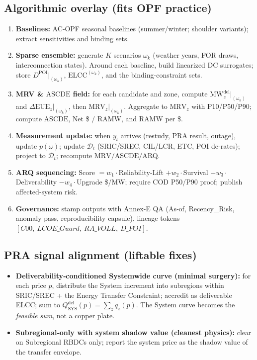 \documentclass[11pt]{article}
\newcommand{\ELCC}{\ensuremath{\mathrm{ELCC}}}
\newcommand{\EUE}{\ensuremath{\mathrm{EUE}}}
\newcommand{\ASCDE}{\ensuremath{\mathrm{ASCDE}}}
\newcommand{\MRV}{\ensuremath{\mathrm{MRV}}}
\numberwithin{equation}{section}
\theoremstyle{definition}
\theoremstyle{remark}
\begin{document}
\subsection{Algorithmic overlay (fits OPF practice)}
\begin{enumerate}[leftmargin=1.2em]
  \item \textbf{Baselines:} AC‑OPF seasonal baselines (summer/winter; shoulder variants); extract sensitivities and binding sets.
\item \textbf{Sparse ensemble:} generate $K$ scenarios $\omega_k$ (weather years, FOR draws, interconnection states).
Around each baseline, build linearized DC surrogates; store $D^{\mathrm{POI}}\big|_{(\omega_k)}$, $\ELCC^{(\omega_k)}$, and the binding-constraint sets.
\item \textbf{MRV \& \ASCDE{} field:} for each candidate and zone, compute
$\mathrm{MW}^{\mathrm{del}}_{z}\big|_{(\omega_k)}$ and
$\Delta \EUE_{z}\big|_{(\omega_k)}$, then
$\MRV_{z}\big|_{(\omega_k)}$. Aggregate to $\MRV_{z}$ with P10/P50/P90;
compute $\ASCDE$, Net \$ / RA\text{-}MW, and RA\text{-}MW per \$.
  \item \textbf{Measurement update:} when \(y_t\) arrives (restudy, PRA result, outage), update \(p(\omega)\); update \(\mathcal{D}_t\) (SRIC/SREC, CIL/LCR, ETC, POI de‑rates); project to \(\mathcal{D}_t\); recompute \(\MRV/\ASCDE/\)ARQ.
  \item \textbf{ARQ sequencing:} Score \(= w_1\cdot\)Reliability‑Lift \(+ w_2\cdot\)Survival \(+ w_3\cdot\)Deliverability \(- w_4\cdot\)Upgrade \$/MW; require COD P50/P90 proof; publish affected‑system risk.
  \item \textbf{Governance:} stamp outputs with Annex‑E QA (As‑of, Recency\_Risk, anomaly pass, reproducibility capsule), lineage tokens \([C00,\ LCOE\_Guard,\ RA\_VOLL,\ D\_POI]\).
\end{enumerate}

\subsection{PRA signal alignment (liftable fixes)}
\begin{itemize}[leftmargin=1.2em]
  \item \textbf{Deliverability‑conditioned Systemwide curve (minimal surgery):} for each price \(p\), distribute the System increment into subregions within SRIC/SREC + the Energy Transfer Constraint; accredit as deliverable ELCC; sum to \(Q^{\mathrm{del}}_{\mathrm{SYS}}(p)=\sum_z q_z(p)\). The System curve becomes the \emph{feasible sum}, not a copper plate.
  \item \textbf{Subregional‑only with system shadow value (cleanest physics):} clear on Subregional RBDCs only; report the system price as the shadow value of the transfer envelope.
\end{itemize}
\end{document}
